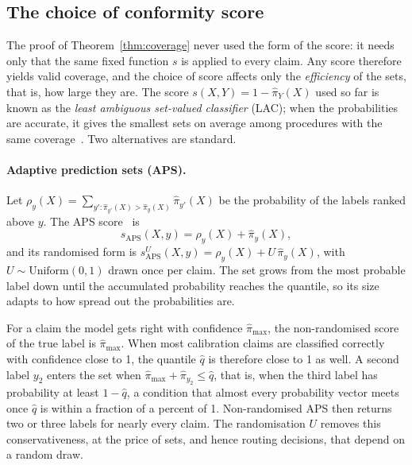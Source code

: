 \subsection{The choice of conformity score}
\label{sec:scores}

The proof of Theorem~\ref{thm:coverage} never used the form of the score: it needs only that the same fixed function $s$ is applied to every claim. Any score therefore yields valid coverage, and the choice of score affects only the \emph{efficiency} of the sets, that is, how large they are. The score $s(X, Y) = 1 - \hat{\pi}_Y(X)$ used so far is known as the \emph{least ambiguous set-valued classifier} (LAC); when the probabilities are accurate, it gives the smallest sets on average among procedures with the same coverage~\citep{sadinle2019least}. Two alternatives are standard.

\paragraph{Adaptive prediction sets (APS).} Let $\rho_y(X) = \sum_{y' : \hat{\pi}_{y'}(X) > \hat{\pi}_y(X)} \hat{\pi}_{y'}(X)$ be the probability of the labels ranked above $y$. The APS score~\citep{romano2020classification} is
\begin{equation}
  s_{\text{APS}}(X, y) = \rho_y(X) + \hat{\pi}_y(X),
\end{equation}
and its randomised form is $s_{\text{APS}}^{U}(X, y) = \rho_y(X) + U\, \hat{\pi}_y(X)$, with $U \sim \text{Uniform}(0, 1)$ drawn once per claim. The set grows from the most probable label down until the accumulated probability reaches the quantile, so its size adapts to how spread out the probabilities are.

\begin{remark}
\label{rem:aps}
For a claim the model gets right with confidence $\hat{\pi}_{\max}$, the non-randomised score of the true label is $\hat{\pi}_{\max}$. When most calibration claims are classified correctly with confidence close to 1, the quantile $\hat{q}$ is therefore close to 1 as well. A second label $y_2$ enters the set when $\hat{\pi}_{\max} + \hat{\pi}_{y_2} \le \hat{q}$, that is, when the third label has probability at least $1 - \hat{q}$, a condition that almost every probability vector meets once $\hat{q}$ is within a fraction of a percent of 1. Non-randomised APS then returns two or three labels for nearly every claim. The randomisation $U$ removes this conservativeness, at the price of sets, and hence routing decisions, that depend on a random draw.
\end{remark}

